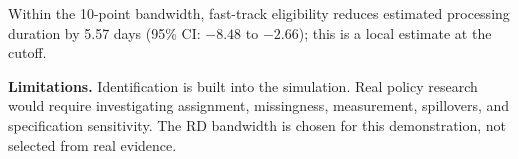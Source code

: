 \documentclass[11pt]{article}
\begin{document}
Within the 10-point bandwidth, fast-track eligibility reduces estimated
processing duration by 5.57 days (95\% CI: $-8.48$ to $-2.66$); this is a
local estimate at the cutoff.

\textbf{Limitations.} Identification is built into the simulation.
Real policy research would require investigating assignment, missingness,
measurement, spillovers, and specification sensitivity. The RD bandwidth
is chosen for this demonstration, not selected from real evidence.
\end{document}
